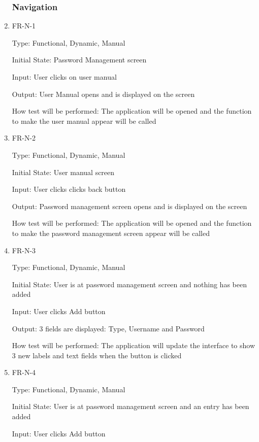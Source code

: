 \documentclass[12pt, titlepage]{article}
\begin{document}
\begin{enumerate}
\subsubsection{Navigation}

\item{FR-N-1\\}

Type: Functional, Dynamic, Manual

Initial State: Password Management screen

Input: User clicks on user manual

Output: User Manual opens and is displayed on the screen

How test will be performed: The application will be opened and the function to make the user manual appear will be called

\item{FR-N-2\\}

Type: Functional, Dynamic, Manual

Initial State: User manual screen

Input: User clicks clicks back button

Output: Password management screen opens and is displayed on the screen

How test will be performed: The application will be opened and the function to make the password management screen appear will be called

\item{FR-N-3\\}

Type: Functional, Dynamic, Manual

Initial State: User is at password management screen and nothing has been added

Input: User clicks Add button

Output: 3 fields are displayed: Type, Username and Password

How test will be performed: The application will update the interface to show 3 new labels and text fields when the button is clicked

\item{FR-N-4\\}

Type: Functional, Dynamic, Manual

Initial State: User is at password management screen and an entry has been added

Input: User clicks Add button


\end{enumerate}
\end{document}
